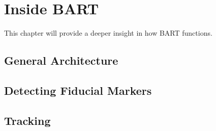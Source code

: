 \chapter{Inside BART}

This chapter will provide a deeper insight in how BART functions.

\section{General Architecture}

\section{Detecting Fiducial Markers}

\section{Tracking}

